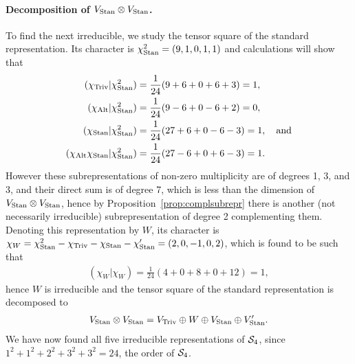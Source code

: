 {\begin{example}
	\paragraph{Decomposition of $V_{\text{Stan}} \otimes V_{\text{Stan}}$.} To find the next irreducible, we study the tensor square of the standard representation. Its character is $\chi_{\text{Stan}}^2 = (9,1,0,1,1)$ and calculations will show that
	\begin{align*}
		(\chi_{\text{Triv}} | \chi_{\text{Stan}}^2) & = \frac{1}{24}(9 + 6 + 0 + 6 + 3) = 1, \\
		(\chi_{\text{Alt}} | \chi_{\text{Stan}}^2)  &= \frac{1}{24}(9-6+0-6+2) = 0, \\
		(\chi_{\text{Stan}} | \chi_{\text{Stan}}^2)  &= \frac{1}{24}(27+6+0-6-3) = 1, \quad \text{and} \\
		(\chi_{\text{Alt}}\chi_{\text{Stan}} | \chi_{\text{Stan}}^2)  &= \frac{1}{24}(27-6+0+6-3) = 1.
	\end{align*}
	However these subrepresentations of non-zero multiplicity are of degrees 1, 3, and 3, and their direct sum is of degree 7, which is less than the dimension of $V_{\text{Stan}} \otimes V_{\text{Stan}}$, hence by Proposition~\ref{prop:complsubrepr} there is another (not necessarily irreducible) subrepresentation of degree 2 complementing them. Denoting this representation by $W$, its character is $\chi_W = \chi_{\text{Stan}}^2 - \chi_{\text{Triv}} - \chi_{\text{Stan}} - \chi'_{\text{Stan}} = (2,0,-1,0,2)$, which is found to be such that 
	\begin{align*}
		(\chi_W|\chi_W) = \frac{1}{24}(4 + 0 + 8 + 0 + 12) = 1,
	\end{align*}
	hence $W$ is irreducible and the tensor square of the standard representation is decomposed to 
	\begin{align*}
		V_{\text{Stan}} \otimes V_{\text{Stan}} = V_{\text{Triv}} \oplus W \oplus V_{\text{Stan}} \oplus V'_{\text{Stan}}.
	\end{align*}
	We have now found all five irreducible representations of $\mathcal{S}_4$, since $1^2 + 1^2 +  2^2 + 3^2 + 3^2 = 24$, the order of $\mathcal{S}_4$.

\end{example}}

